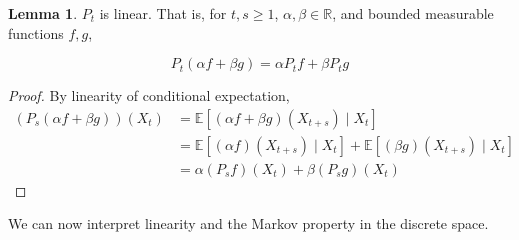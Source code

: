 \documentclass{article}
\theoremstyle{definition}
\newtheorem{lemma}[theorem]{Lemma}
\theoremstyle{remark}
\theoremstyle{definition}
\begin{document}
  \begin{lemma}
    $P_t$ is linear. That is, for $t, s \geq 1$, $\alpha, \beta \in \mathbb{R}$, and bounded measurable functions $f, g$, 

      \[P_t (\alpha f + \beta g) = \alpha P_t f + \beta P_t g\] 
  \end{lemma}
  \begin{proof}
    By linearity of conditional expectation, 
    \begin{align*}
      (P_s (\alpha f + \beta g))(X_t) & = \mathbb{E}[(\alpha f + \beta g)(X_{t + s}) \mid X_t] \\
      & = \mathbb{E}[(\alpha f) (X_{t + s}) \mid X_t] + \mathbb{E}[(\beta g) (X_{t + s}) \mid X_t] \\
      & = \alpha (P_s f) (X_t) + \beta (P_s g) (X_t)
    \end{align*}
  \end{proof}

  We can now interpret linearity and the Markov property in the discrete space. 
\end{document}
